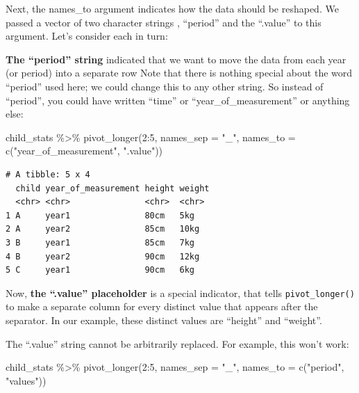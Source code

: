 \documentclass[
  letterpaper,
  DIV=11,
  numbers=noendperiod]{scrreprt}
\newenvironment{Shaded}{\begin{snugshade}}{\end{snugshade}}
\newcommand{\AttributeTok}[1]{\textcolor[rgb]{0.40,0.45,0.13}{#1}}
\newcommand{\DecValTok}[1]{\textcolor[rgb]{0.68,0.00,0.00}{#1}}
\newcommand{\FunctionTok}[1]{\textcolor[rgb]{0.28,0.35,0.67}{#1}}
\newcommand{\NormalTok}[1]{\textcolor[rgb]{0.00,0.23,0.31}{#1}}
\newcommand{\SpecialCharTok}[1]{\textcolor[rgb]{0.37,0.37,0.37}{#1}}
\newcommand{\StringTok}[1]{\textcolor[rgb]{0.13,0.47,0.30}{#1}}
\begin{document}
Next, the names\_to argument indicates how the data should be reshaped.
We passed a vector of two character strings , ``period'' and the
``.value'' to this argument. Let's consider each in turn:

\textbf{The ``period'' string} indicated that we want to move the data
from each year (or period) into a separate row Note that there is
nothing special about the word ``period'' used here; we could change
this to any other string. So instead of ``period'', you could have
written ``time'' or ``year\_of\_measurement'' or anything else:

\begin{Shaded}
\begin{Highlighting}[]
\NormalTok{child\_stats }\SpecialCharTok{\%\textgreater{}\%} 
  \FunctionTok{pivot\_longer}\NormalTok{(}\DecValTok{2}\SpecialCharTok{:}\DecValTok{5}\NormalTok{, }
               \AttributeTok{names\_sep =} \StringTok{"\_"}\NormalTok{,}
               \AttributeTok{names\_to =} \FunctionTok{c}\NormalTok{(}\StringTok{"year\_of\_measurement"}\NormalTok{, }\StringTok{".value"}\NormalTok{))}
\end{Highlighting}
\end{Shaded}

\begin{verbatim}
# A tibble: 5 x 4
  child year_of_measurement height weight
  <chr> <chr>               <chr>  <chr> 
1 A     year1               80cm   5kg   
2 A     year2               85cm   10kg  
3 B     year1               85cm   7kg   
4 B     year2               90cm   12kg  
5 C     year1               90cm   6kg   
\end{verbatim}

Now, \textbf{the ``.value'' placeholder} is a special indicator, that
tells \texttt{pivot\_longer()} to make a separate column for every
distinct value that appears after the separator. In our example, these
distinct values are ``height'' and ``weight''.

The ``.value'' string cannot be arbitrarily replaced. For example, this
won't work:

\begin{Shaded}
\begin{Highlighting}[]
\NormalTok{child\_stats }\SpecialCharTok{\%\textgreater{}\%} 
  \FunctionTok{pivot\_longer}\NormalTok{(}\DecValTok{2}\SpecialCharTok{:}\DecValTok{5}\NormalTok{, }
               \AttributeTok{names\_sep =} \StringTok{"\_"}\NormalTok{, }
               \AttributeTok{names\_to =} \FunctionTok{c}\NormalTok{(}\StringTok{"period"}\NormalTok{, }\StringTok{"values"}\NormalTok{))}
\end{Highlighting}
\end{Shaded}
\end{document}
